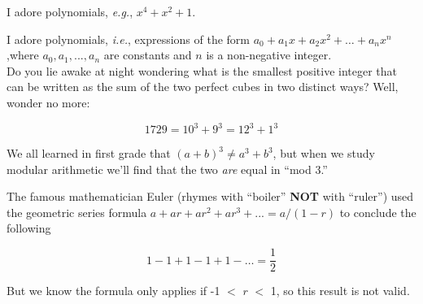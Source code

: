 \documentclass{amsart}
\begin{document}
I adore polynomials, \emph{e.g.}, $x^{4}+x^{2}+1$.


I adore polynomials, \emph{i.e.}, expressions of the form
$a_{0} + a_{1}x + a_{2}x^{2} + \dots + a_{n}x^{n}$,where $a_{0},a_{1},...,a_{n}$ are
constants and $n$ is a non-negative integer.\\

Do you lie awake at night wondering what is the smallest positive integer that
can be written as the sum of the two perfect cubes in two distinct ways? Well,
wonder no more:

$$ 1729 = 10^{3} + 9^{3} = 12^{3} + 1^{3} $$

We all learned in first grade that $(a + b)^{3} \neq a^{3} + b^{3}$, but when we
study modular arithmetic we'll find that the two \emph{are} equal in ``mod 3.''

The famous mathematician Euler (rhymes with ``boiler'' \textbf{NOT} with
``ruler'') used the geometric series formula
$a + ar + ar^{2} + ar^{3} + ... = a / (1 - r)$ to conclude the following

$$ 1 - 1 + 1 - 1 + 1 - \dots = \frac{1}{2} $$

But we know the formula only applies if -1 $<$ $r$ $<$ 1, so this result is not
valid.
\end{document}
